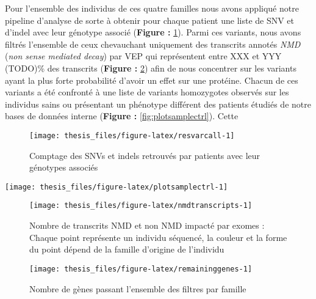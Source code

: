 \documentclass[12pt,twoside]{reedthesis}
\theoremstyle{definition}
\theoremstyle{definition}
\theoremstyle{remark}
\begin{document}
  Pour l'ensemble des individus de ces quatre familles nous avons appliqué
  notre pipeline d'analyse de sorte à obtenir pour chaque patient une
  liste de SNV et d'indel avec leur génotype associé (\textbf{Figure :
  }\ref{fig:resvarcall}). Parmi ces variants, nous avons filtrés
  l'ensemble de ceux chevauchant uniquement des transcrits annotés
  \emph{NMD} (\emph{non sense mediated decay}) par VEP qui représentent
  entre XXX et YYY (TODO)\% des transcrits (\textbf{Figure :
  }\ref{fig:nmdtranscripts}) afin de nous concentrer sur les variants
  ayant la plus forte probabilité d'avoir un effet sur une protéine.
  Chacun de ces variants a été confronté à une liste de variants
  homozygotes observés sur les individus sains ou présentant un phénotype
  différent des patients étudiés de notre bases de données interne
  (\textbf{Figure : }\ref{fig:plotsamplectrl}). Cette
  
  \begin{figure}
  
  {\centering \texttt{[image: thesis\_files/figure-latex/resvarcall-1]} 
  
  }
  
  \caption[Comptage des SNVs et indels retrouvés par patients avec leur génotypes associés]{Comptage des SNVs et indels retrouvés par patients avec leur génotypes associés}\label{fig:resvarcall}
  \end{figure}
  
  \begin{center}\texttt{[image: thesis\_files/figure-latex/plotsamplectrl-1]} \end{center}
  
  \begin{figure}
  
  {\centering \texttt{[image: thesis\_files/figure-latex/nmdtranscripts-1]} 
  
  }
  
  \caption[Nombre de transcrits NMD et non NMD impacté par exomes]{Nombre de transcrits NMD et non NMD impacté par exomes : Chaque point représente un individu séquencé, la couleur et la forme du point dépend de la famille d'origine de l'individu}\label{fig:nmdtranscripts}
  \end{figure}
  
  \begin{figure}
  
  {\centering \texttt{[image: thesis\_files/figure-latex/remaininggenes-1]} 
  
  }
  
  \caption[Nombre de gènes passant l'ensemble des filtres par famille]{Nombre de gènes passant l'ensemble des filtres par famille}\label{fig:remaininggenes}
  \end{figure}
  
\end{document}
